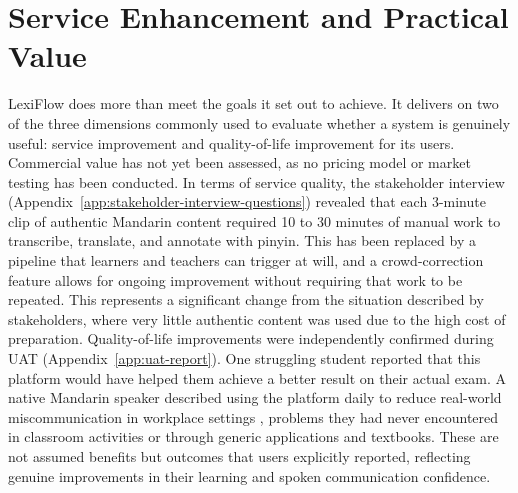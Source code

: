 \documentclass[oneside]{utmthesis}
\begin{document}
\section{Service Enhancement and Practical Value}LexiFlow does more than meet the goals it set out to achieve. It delivers on two of the three dimensions commonly used to evaluate whether a system is genuinely useful: service improvement and quality-of-life improvement for its users. Commercial value has not yet been assessed, as no pricing model or market testing has been conducted. In terms of service quality, the stakeholder interview (Appendix~\ref{app:stakeholder-interview-questions}) revealed that each 3-minute clip of authentic Mandarin content required 10 to 30 minutes of manual work to transcribe, translate, and annotate with pinyin. This has been replaced by a pipeline that learners and teachers can trigger at will, and a crowd-correction feature allows for ongoing improvement without requiring that work to be repeated. This represents a significant change from the situation described by stakeholders, where very little authentic content was used due to the high cost of preparation. Quality-of-life improvements were independently confirmed during UAT (Appendix~\ref{app:uat-report}). One struggling student reported that this platform would have helped them achieve a better result on their actual exam. A native Mandarin speaker described using the platform daily to reduce real-world miscommunication in workplace settings , problems they had never encountered in classroom activities or through generic applications and textbooks. These are not assumed benefits but outcomes that users explicitly reported, reflecting genuine improvements in their learning and spoken communication confidence.
\end{document}
